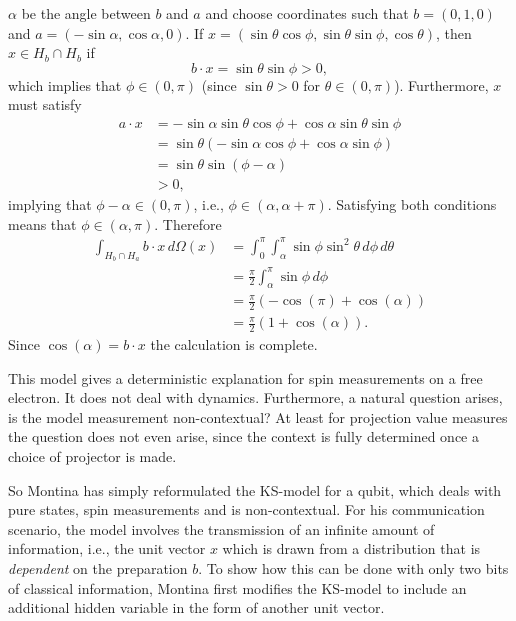 \documentclass[12pt,draft]{article}
\theoremstyle{definition}
\theoremstyle{plain}
\begin{document}
{        $\alpha$ be the angle between $b$ and $a$ and choose
        coordinates such that $b = (0,1,0)$ and $a =
        (-\sin\alpha, \cos\alpha,0)$. If $x =
        (\sin\theta\cos\phi,\sin\theta\sin\phi,\cos\theta)$,
        then $x \in H_b \cap H_b$ if
        \begin{equation}
            b \cdot x
            = \sin\theta\sin\phi > 0,
        \end{equation}
        which implies that $\phi \in (0,\pi)$ (since
        $\sin\theta > 0$ for $\theta \in (0,\pi)$).
        Furthermore, $x$ must satisfy
        \begin{align}
            a \cdot x
            &= -\sin\alpha \sin\theta\cos\phi + \cos\alpha
            \sin\theta\sin\phi \\
            &= \sin\theta \left( 
                -\sin\alpha\cos\phi + \cos\alpha\sin\phi
            \right) \\
            &= \sin\theta \sin(\phi - \alpha) \\
            &> 0,
        \end{align}
        implying that $\phi - \alpha \in (0,\pi)$, i.e.,
        $\phi \in (\alpha,\alpha + \pi)$. Satisfying both
        conditions means that $\phi \in (\alpha, \pi)$.
        Therefore
        \begin{align}
            \int_{H_b \cap H_a} b \cdot x \, d\Omega(x)
            &= \int_{0}^{\pi} \int_{\alpha}^{\pi} \sin\phi
            \sin^2\theta \, d\phi \, d\theta \\
            &= \frac{\pi}{2}
            \int_{\alpha}^{\pi} \sin\phi \, d\phi
            \\
            &= \frac{\pi}{2} \left(
                -\cos(\pi) + \cos(\alpha)
            \right) \\
            &= \frac{\pi}{2} \left( 
                1 + \cos(\alpha)
            \right). 
        \end{align}
        Since $\cos(\alpha) = b \cdot x$ the calculation is
        complete.
        
        This model gives a deterministic explanation for
        spin measurements on a free electron. It does not
        deal with dynamics. Furthermore, a natural question
        arises, is the model measurement non-contextual? At
        least for projection value measures the question
        does not even arise, since the context is fully
        determined once a choice of projector is made.
    }

    So Montina has simply reformulated the KS-model for a
    qubit, which deals with pure states, spin measurements
    and is non-contextual. For his communication scenario,
    the model involves the transmission of an infinite
    amount of information, i.e., the unit vector $x$ which
    is drawn from a distribution that is \textit{dependent}
    on the preparation $b$. To show how this can be done
    with only two bits of classical information, Montina
    first modifies the KS-model to include an additional
    hidden variable in the form of another unit vector.
\end{document}
